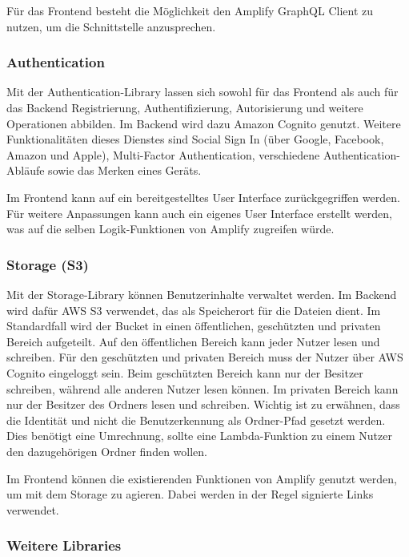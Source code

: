 Für das Frontend besteht die Möglichkeit den Amplify GraphQL Client zu nutzen, um die Schnittstelle anzusprechen.

\subsubsection{Authentication}

Mit der Authentication-Library lassen sich sowohl für das Frontend als auch für das Backend Registrierung, Authentifizierung, Autorisierung und weitere Operationen abbilden. Im Backend wird dazu Amazon Cognito genutzt. Weitere Funktionalitäten dieses Dienstes sind Social Sign In (über Google, Facebook, Amazon und Apple), Multi-Factor Authentication, verschiedene Authentication-Abläufe sowie das Merken eines Geräts.

Im Frontend kann auf ein bereitgestelltes User Interface zurückgegriffen werden. Für weitere Anpassungen kann auch ein eigenes User Interface erstellt werden, was auf die selben Logik-Funktionen von Amplify zugreifen würde.

\subsubsection{Storage (S3)}

Mit der Storage-Library können Benutzerinhalte verwaltet werden. Im Backend wird dafür \ac{AWS} S3 verwendet, das als Speicherort für die Dateien dient. Im Standardfall wird der Bucket in einen öffentlichen, geschützten und privaten Bereich aufgeteilt. Auf den öffentlichen Bereich kann jeder Nutzer lesen und schreiben. Für den geschützten und privaten Bereich muss der Nutzer über \ac{AWS} Cognito eingeloggt sein. Beim geschützten Bereich kann nur der Besitzer schreiben, während alle anderen Nutzer lesen können. Im privaten Bereich kann nur der Besitzer des Ordners lesen und schreiben. Wichtig ist zu erwähnen, dass die Identität und nicht die Benutzerkennung als Ordner-Pfad gesetzt werden. Dies benötigt eine Umrechnung, sollte eine Lambda-Funktion zu einem Nutzer den dazugehörigen Ordner finden wollen.

Im Frontend können die existierenden Funktionen von Amplify genutzt werden, um mit dem Storage zu agieren. Dabei werden in der Regel signierte Links verwendet.

\subsubsection{Weitere Libraries}

